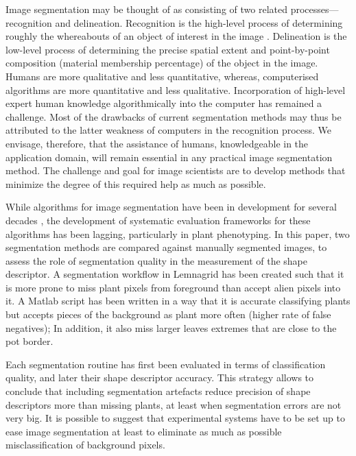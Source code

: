 \documentclass{frontiersSCNS} %
\begin{document}
Image segmentation may be thought of as consisting of two related processes—recognition and delineation. Recognition is the high-level process of determining roughly the whereabouts of an object of interest in the image \cite{Udupa200675}. Delineation is the low-level process of determining the precise spatial extent and point-by-point composition (material membership percentage) of the object in the image. Humans are more qualitative and less quantitative, whereas, computerised algorithms are more quantitative and less qualitative. Incorporation of high-level expert human knowledge algorithmically into the computer has remained a challenge. Most of the drawbacks of current segmentation methods may thus be attributed to the latter weakness of computers in the recognition process. We envisage, therefore, that the assistance of humans, knowledgeable in the application domain, will remain essential in any practical image segmentation method. The challenge and goal for image scientists are to develop methods that minimize the degree of this required help as much as possible.

While algorithms for image segmentation have been in development for several decades \cite{ZAITOUN2015797}, the development of systematic evaluation frameworks for these algorithms has been lagging, particularly in plant phenotyping. In this paper, two segmentation methods are compared against manually segmented images, to assess the role of segmentation quality in the measurement of the shape descriptor. A segmentation workflow in Lemnagrid \cite{ISI:000245413900027} has been created such that it is more prone to miss plant pixels from foreground than accept alien pixels into it. A Matlab \cite{MATLAB:2010} script has been written in a way that it is accurate classifying plants but accepts pieces of the background as plant more often (higher rate of false negatives); In addition, it also miss larger leaves extremes that are close to the pot border.





Each segmentation routine has first been evaluated in terms of classification quality, and later their shape descriptor accuracy. This strategy allows to conclude that including segmentation artefacts reduce precision of shape descriptors more than missing plants, at least when segmentation errors are not very big. It is possible to suggest that experimental systems have to be set up to ease image segmentation at least to eliminate as much as possible misclassification of background pixels.
\end{document}
